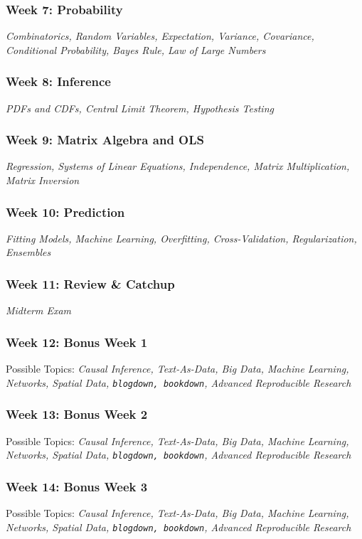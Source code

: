 \documentclass[11pt, letterpaper]{article}
\begin{document}
\subsubsection*{Week 7: Probability}
\textit{Combinatorics, Random Variables, Expectation, Variance, Covariance, Conditional Probability, Bayes Rule, Law of Large Numbers}

\subsubsection*{Week 8: Inference}
\textit{PDFs and CDFs, Central Limit Theorem, Hypothesis Testing}

\subsubsection*{Week 9: Matrix Algebra and OLS}
\textit{Regression, Systems of Linear Equations, Independence, Matrix Multiplication, Matrix Inversion}

\subsubsection*{Week 10: Prediction}
\textit{Fitting Models, Machine Learning, Overfitting, Cross-Validation, Regularization, Ensembles}

\subsubsection*{Week 11: Review \& Catchup}
\textit{Midterm Exam}

\subsubsection*{Week 12: Bonus Week 1}
Possible Topics: \textit{Causal Inference, Text-As-Data, Big Data, Machine Learning, Networks, Spatial Data, \texttt{blogdown, bookdown}, Advanced Reproducible Research}

\subsubsection*{Week 13: Bonus Week 2}
Possible Topics: \textit{Causal Inference, Text-As-Data, Big Data, Machine Learning, Networks, Spatial Data, \texttt{blogdown, bookdown}, Advanced Reproducible Research}

\subsubsection*{Week 14: Bonus Week 3}
Possible Topics: \textit{Causal Inference, Text-As-Data, Big Data, Machine Learning, Networks, Spatial Data, \texttt{blogdown, bookdown}, Advanced Reproducible Research}
\end{document}
